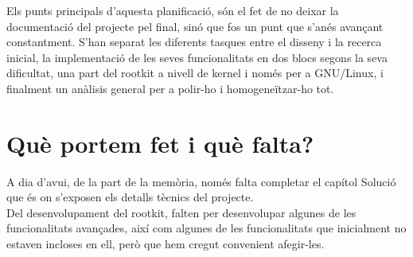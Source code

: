 \documentclass[a4paper]{article}
\begin{document}
Els punts principals d'aquesta planificació, són el fet de no deixar la documentació del projecte pel final,
sinó que fos un punt que s'anés avançant constantment. S'han separat les diferents tasques entre el disseny
i la recerca inicial, la implementació de les seves funcionalitats en dos blocs segons la seva dificultat,
una part del rootkit a nivell de kernel i només per a GNU/Linux, i finalment un anàlisis general per a polir-ho
i homogeneïtzar-ho tot. \\

\section{Què portem fet i què falta?}

A dia d'avui, de la part de la memòria, només falta completar el capítol Solució que és on s'exposen els
detalls tècnics del projecte. \\

Del desenvolupament del rootkit, falten per desenvolupar algunes de les funcionalitats avançades, així com 
algunes de les funcionalitats que inicialment no estaven incloses en ell, però que hem cregut convenient
afegir-les.
\end{document}

